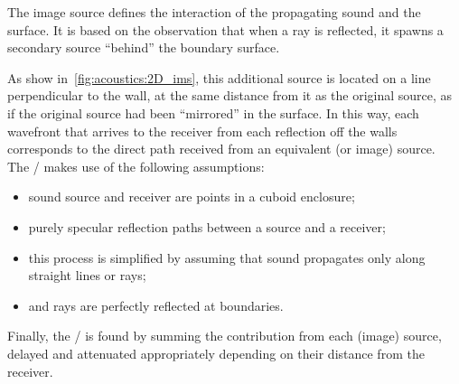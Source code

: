 \begin{figure}[h]
    \resizebox{\linewidth}{!}{
        
    }
\end{figure}

\noindent The image source defines the interaction of the propagating sound and the surface.
It is based on the observation that when a ray is reflected, it spawns a secondary source ``behind'' the boundary surface.

\begin{figure}[h]
    \resizebox{\linewidth}{!}{
        
    }
\end{figure}
\noindent As show in~\cref{fig:acoustics:2D_ims}, this additional source is located on a line perpendicular to the wall, at the same distance from it as the original source, as if the original source had been “mirrored” in the surface.
In this way, each wavefront that arrives to the receiver from each reflection off the walls corresponds to the direct path received from an equivalent (or image) source.
\\The \ISM/ makes use of the following assumptions:
\begin{itemize}
    \item sound source and receiver are points in a cuboid enclosure;
    \item purely specular reflection paths between a source and a receiver;
    \item this process is simplified by assuming that sound propagates only along straight lines or rays;
    \item and rays are perfectly reflected at boundaries.
\end{itemize}
Finally, the \RIR/ is found by summing the contribution from each (image) source, delayed and attenuated appropriately depending on their distance from the receiver.
